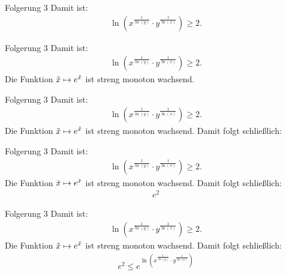 \documentclass[10pt]{beamer}
\begin{document}
\begin{frame}{Folgerung 3}
    Damit ist:
    \begin{align*}
        \ln\left( x^{\frac{1}{\ln\left( y \right)}} \cdot y^{\frac{1}{\ln\left( x \right)}} \right) 
        \geq 2.
    \end{align*}
\end{frame}



\begin{frame}{Folgerung 3}
    Damit ist:
    \begin{align*}
        \ln\left( x^{\frac{1}{\ln\left( y \right)}} \cdot y^{\frac{1}{\ln\left( x \right)}} \right) 
        \geq 2.
    \end{align*}
    Die Funktion \( \Tilde{x} \mapsto e^{\Tilde{x}} \) ist streng monoton wachsend.
\end{frame}



\begin{frame}{Folgerung 3}
    Damit ist:
    \begin{align*}
        \ln\left( x^{\frac{1}{\ln\left( y \right)}} \cdot y^{\frac{1}{\ln\left( x \right)}} \right) 
        \geq 2.
    \end{align*}
    Die Funktion \( \Tilde{x} \mapsto e^{\Tilde{x}} \) ist streng monoton wachsend. Damit folgt schließlich:
\end{frame}



\begin{frame}{Folgerung 3}
    Damit ist:
    \begin{align*}
        \ln\left( x^{\frac{1}{\ln\left( y \right)}} \cdot y^{\frac{1}{\ln\left( x \right)}} \right) 
        \geq 2.
    \end{align*}
    Die Funktion \( \Tilde{x} \mapsto e^{\Tilde{x}} \) ist streng monoton wachsend. Damit folgt schließlich:
    \begin{align*}
        e^{2}
    \end{align*}
\end{frame}



\begin{frame}{Folgerung 3}
    Damit ist:
    \begin{align*}
        \ln\left( x^{\frac{1}{\ln\left( y \right)}} \cdot y^{\frac{1}{\ln\left( x \right)}} \right) 
        \geq 2.
    \end{align*}
    Die Funktion \( \Tilde{x} \mapsto e^{\Tilde{x}} \) ist streng monoton wachsend. Damit folgt schließlich:
    \begin{align*}
        e^{2}
        \leq e^{\ln\left( x^{\frac{1}{\ln\left( y \right)}} \cdot y^{\frac{1}{\ln\left( x \right)}} \right)}
    \end{align*}
\end{frame}
\end{document}
